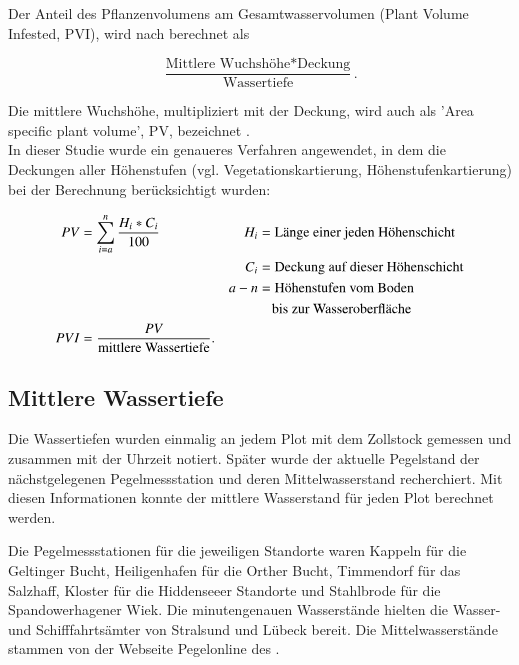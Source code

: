 Der Anteil des Pflanzenvolumens am Gesamtwasservolumen (Plant Volume Infested, PVI), wird nach \cite{jeppesen_1998, schriver_1995, canfield_1984} berechnet als 

\begin{equation*}
\frac{\text{Mittlere Wuchshöhe} * \text{Deckung}}{\text{Wassertiefe}}.
\end{equation*}

Die mittlere Wuchshöhe, multipliziert mit der Deckung, wird auch als 'Area specific plant volume', PV, bezeichnet \citep{jeppesen_1998}.\\
In dieser Studie wurde ein genaueres Verfahren angewendet, in dem die Deckungen aller Höhenstufen (vgl. Vegetationskartierung, Höhenstufenkartierung) bei der Berechnung berücksichtigt wurden:


\begin{align*}
 PV &=\sum_{i=a}^n \frac{H_i * C_i}{100} & H_i &=\text{Länge einer jeden Höhenschicht}\\ 
 & & C_i &=\text{Deckung auf dieser Höhenschicht}\\
 & & a-n &=\text{Höhenstufen vom Boden}\\
 & &     &\text{\quad bis zur Wasseroberfläche}\\
 PVI &=\frac{PV}{\text{mittlere Wassertiefe}}.\\
\end{align*}



\subsection{Mittlere Wassertiefe}

Die Wassertiefen wurden einmalig an jedem Plot mit dem Zollstock gemessen und zusammen mit der Uhrzeit notiert. Später wurde der aktuelle Pegelstand der nächstgelegenen Pegelmessstation und deren Mittelwasserstand recherchiert. Mit diesen Informationen konnte der mittlere Wasserstand für jeden Plot berechnet werden.

Die Pegelmessstationen für die jeweiligen Standorte waren Kappeln für die Geltinger Bucht, Heiligenhafen für die Orther Bucht, Timmendorf für das Salzhaff, Kloster für die Hiddenseeer Standorte und Stahlbrode für die Spandowerhagener Wiek. Die minutengenauen Wasserstände hielten die Wasser- und Schifffahrtsämter von Stralsund und Lübeck bereit. Die Mittelwasserstände stammen von der Webseite Pegelonline des \cite{wasser-_und_schifffahrtsverwaltung_des_bundes_2013}.



